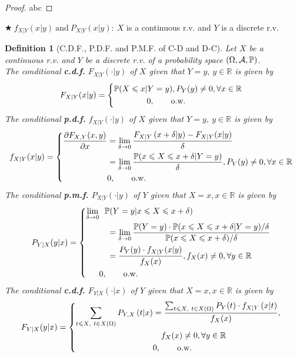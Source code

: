 \documentclass[openany,12pt]{book}
\newtheorem{definition}{Definition}[chapter]
\begin{document}
\begin{proof}
  abc
\end{proof}

$\bigstar\ f_{X|Y}(x|y)\ \mathrm{\text{and}}\ P_{X|Y}(x|y):\ X$ is a continuous r.v. and $Y$ is a discrete r.v.

\begin{definition}[C.D.F., P.D.F. and P.M.F. of C-D and D-C]
Let $X$ be a continuous r.v. and $Y$ be a discrete r.v. of a probability space $(\Omega,\mathcal{A},\mathbb{P})$.\\
The conditional \textbf{c.d.f.} $F_{X|Y}\left( \cdot | y \right)$ of $X$ given that $Y = y,\ y \in \mathbb{R}$ is given by
\[F_{X|Y}(x|y) = \left\{ \begin{aligned}
&\mathbb{P}(X \leqslant x | Y = y),P_{Y}(y) \neq 0,\forall x \in \mathbb{R} \\
&\qquad\qquad0,\qquad\mathrm{\text{o.w.}} \\
\end{aligned} \right.\ \]
The conditional \textbf{p.d.f.} $f_{X|Y}\left( \cdot | y \right)$ of $X$ given that $Y = y,\ y \in \mathbb{R}$ is given by
\[f_{X|Y}(x|y) = \left\{ \begin{aligned}
\frac{\partial F_{X,Y}(x,y)}{\partial x} &= \lim_{\delta \to 0}\frac{F_{X|Y}\left( x + \delta | y \right) - F_{X|Y}(x|y)}{\delta} \\
&= \lim_{\delta \to 0}\frac{\mathbb{P}( x \leqslant X \leqslant x + \delta | Y = y )}{\delta},P_{Y}(y) \neq 0,\forall x \in \mathbb{R} \\
&0,\qquad\mathrm{\text{o.w.}} \\
\end{aligned} \right.\ \]
The conditional \textbf{p.m.f.} $P_{X|Y}\left( \cdot | y \right)$ of $Y$ given that $X = x,x \in \mathbb{R}$ is given by
\[P_{Y|X}(y|x) = \left\{ \begin{aligned}
\lim_{\delta \to 0}&\ \ \mathbb{P}( Y = y | x \leqslant X \leqslant x + \delta ) \\
&\quad= \lim_{\delta \to 0}\frac{\mathbb{P}(Y = y) \cdot \mathbb{P}( x \leqslant X \leqslant x + \delta | Y = y )/\delta}{\mathbb{P}(x \leqslant X \leqslant x + \delta)/\delta} \\
&\quad= \frac{P_{Y}(y) \cdot f_{X|Y}(x|y)}{f_{X}(x)},f_{X}(x) \neq 0,\forall y \in \mathbb{R} \\
&0, \qquad\mathrm{\text{o.w.}} \\
\end{aligned} \right.\ \]
The conditional \textbf{c.d.f.} $F_{Y|X}\left( \cdot | x \right)$ of $Y$ given that $X = x,x \in \mathbb{R}$ is given by
\[F_{Y|X}(y|x) = \left\{ \begin{aligned}
\sum_{t \leqslant X,\ t \in X(\Omega) }^{}{P_{Y,X}\left( t|x \right)} &= \frac{\sum_{t \leqslant X,\ t \in X(\Omega)}^{}{P_{Y}(t) \cdot f_{X|Y}\left( x | t \right)}}{f_{X}(x)},\\
&\quad f_{X}(x) \neq 0,\forall y \in \mathbb{R} \\
&0, \qquad\mathrm{\text{o.w.}} \\
\end{aligned} \right.\ \]
\end{definition}
\end{document}
